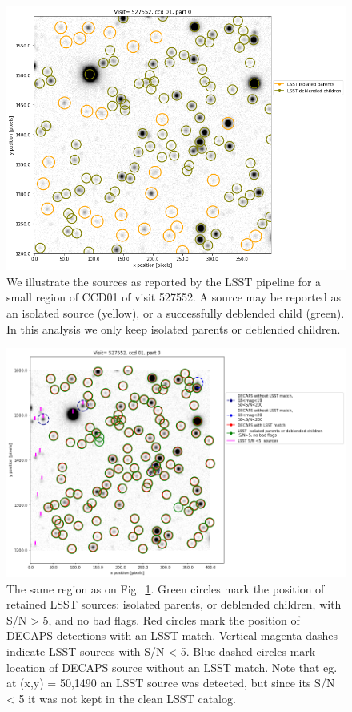 \documentclass[DM,lsstdraft,toc,usenatbib]{lsstdoc}
\begin{document}
\begin{figure}
\begin{centering}
\includegraphics[width=1.0\columnwidth]{figs/visit_527552_ccd_1.png}
\vskip -0.15in
\caption{We illustrate the sources as reported by the LSST pipeline for a small region of CCD01 of visit 527552. A source may be reported as an isolated source (yellow),  or a successfully deblended child (green). In this analysis we only keep isolated parents or deblended children.}
\label{fig:lsst_sources}
\end{centering}
\end{figure} 


\begin{figure}
\begin{centering}
\includegraphics[width=1.1\columnwidth]{figs/visit_527552_ccd_1_lowSN.png}
\caption{The same region as on Fig.~\ref{fig:lsst_sources}. Green circles mark the position of retained LSST sources: isolated parents, or deblended children, with  S/N > 5, and no bad flags. Red circles mark the position of DECAPS detections with an LSST match. Vertical magenta dashes indicate LSST sources with S/N < 5.   Blue dashed circles mark location of DECAPS source without an LSST match. Note that eg. at (x,y) = 50,1490  an LSST source was detected, but since its  S/N < 5 it was not kept in the clean LSST catalog.   }
\label{fig:lsst_decaps_sources}
\end{centering}
\end{figure}
\end{document}
